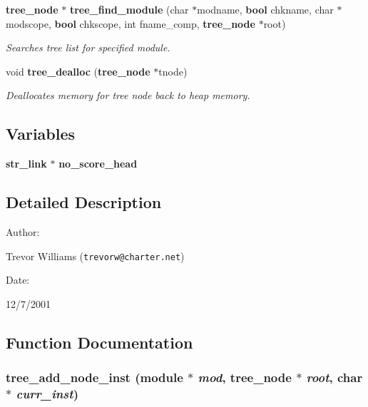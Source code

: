 \begin{CompactItemize}
{\bf tree\_\-node} $\ast$ {\bf tree\_\-find\_\-module} (char $\ast$modname, {\bf bool} chkname, char $\ast$modscope, {\bf bool} chkscope, int fname\_\-comp, {\bf tree\_\-node} $\ast$root)
\begin{CompactList}\small\item\em Searches tree list for specified module.\item\end{CompactList}\item 
void {\bf tree\_\-dealloc} ({\bf tree\_\-node} $\ast$tnode)
\begin{CompactList}\small\item\em Deallocates memory for tree node back to heap memory.\item\end{CompactList}\end{CompactItemize}
\subsection*{Variables}
\begin{CompactItemize}
\item 
{\bf str\_\-link} $\ast$ {\bf no\_\-score\_\-head}
\end{CompactItemize}


\subsection{Detailed Description}


\begin{Desc}
\item[Author: ]\par
Trevor Williams ({\tt trevorw@charter.net}) \end{Desc}
\begin{Desc}
\item[Date: ]\par
12/7/2001\end{Desc}


\subsection{Function Documentation}
\subsubsection{ tree\_\-add\_\-node\_\-inst ({\bf module} $\ast$ {\em mod}, {\bf tree\_\-node} $\ast$ {\em root}, char $\ast$ {\em curr\_\-inst})}\label{tree_8c_a3}


